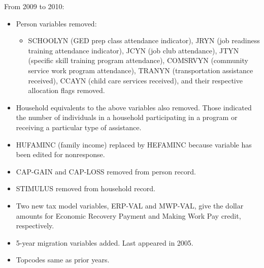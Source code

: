 \documentclass{article}
\begin{document}
From 2009 to 2010:
\begin{itemize}
	\item Person variables removed:
	\begin{itemize}
		\item SCHOOLYN (GED prep class attendance indicator), JRYN (job readiness training attendance indicator), JCYN (job club attendance), JTYN (specific skill training program attendance), COMSRVYN (community service work program attendance), TRANYN (transportation assistance received), CCAYN (child care services received), and their respective allocation flags removed.
	\end{itemize}
	\item Household equivalents to the above variables also removed. Those indicated the number of individuals in a household participating in a program or receiving a particular type of assistance.
	\item HUFAMINC (family income) replaced by HEFAMINC because variable has been edited for nonresponse.
	\item CAP-GAIN and CAP-LOSS removed from person record.
	\item STIMULUS removed from household record.
	\item Two new tax model variables, ERP-VAL and MWP-VAL, give the dollar amounts for Economic Recovery Payment and Making Work Pay credit, respectively.
	\item 5-year migration variables added. Last appeared in 2005.
	\item Topcodes same as prior years.
\end{itemize}
	
\end{document}
